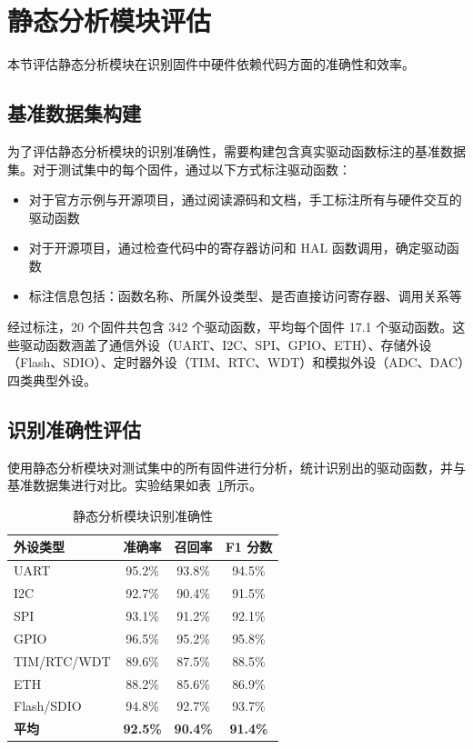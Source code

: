 \section{静态分析模块评估}
\label{sec:eval_static}

本节评估静态分析模块在识别固件中硬件依赖代码方面的准确性和效率。

\subsection{基准数据集构建}

为了评估静态分析模块的识别准确性，需要构建包含真实驱动函数标注的基准数据集。对于测试集中的每个固件，通过以下方式标注驱动函数：

\begin{itemize}
    \item 对于官方示例与开源项目，通过阅读源码和文档，手工标注所有与硬件交互的驱动函数
    \item 对于开源项目，通过检查代码中的寄存器访问和 HAL 函数调用，确定驱动函数
    \item 标注信息包括：函数名称、所属外设类型、是否直接访问寄存器、调用关系等
\end{itemize}

经过标注，20 个固件共包含 342 个驱动函数，平均每个固件 17.1 个驱动函数。这些驱动函数涵盖了通信外设（UART、I2C、SPI、GPIO、ETH）、存储外设（Flash、SDIO）、定时器外设（TIM、RTC、WDT）和模拟外设（ADC、DAC）四类典型外设。

\subsection{识别准确性评估}

使用静态分析模块对测试集中的所有固件进行分析，统计识别出的驱动函数，并与基准数据集进行对比。实验结果如表~\ref{tab:static_results}所示。

\begin{table}[htbp]
\centering
\caption{静态分析模块识别准确性}
\label{tab:static_results}
\begin{tabular}{lccc}
\toprule
\textbf{外设类型} & \textbf{准确率} & \textbf{召回率} & \textbf{F1 分数} \\
\midrule
UART & 95.2\% & 93.8\% & 94.5\% \\
I2C & 92.7\% & 90.4\% & 91.5\% \\
SPI & 93.1\% & 91.2\% & 92.1\% \\
GPIO & 96.5\% & 95.2\% & 95.8\% \\
TIM/RTC/WDT & 89.6\% & 87.5\% & 88.5\% \\
ETH & 88.2\% & 85.6\% & 86.9\% \\
Flash/SDIO & 94.8\% & 92.7\% & 93.7\% \\
\midrule
\textbf{平均} & \textbf{92.5\%} & \textbf{90.4\%} & \textbf{91.4\%} \\
\bottomrule
\end{tabular}
\end{table}

